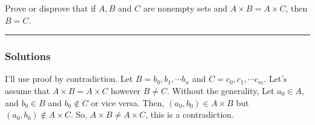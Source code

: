 \begin{question}
Prove or disprove that if $A, B$ and $C$ are nonempty sets and $A \times B = A \times C$, then $B = C$.
\end{question}

\par\noindent\rule{\textwidth}{0.5pt}

\subsubsection*{Solutions}
\indent
I'll use proof by contradiction.
Let $B = {b_0, b_1, \cdots b_n}$ and $C = {c_0, c_1, \cdots c_m}$.
Let's assume that $A \times B = A \times C$ however $B \neq C$.
Without the generality, Let $a_0 \in A$, and $b_0 \in B$ and $b_0 \notin C$ or vice versa. Then, $(a_0, b_0) \in A \times B$ but $(a_0, b_0) \notin A \times C$. So, $A \times B \neq A \times C$, this is a contradiction.
